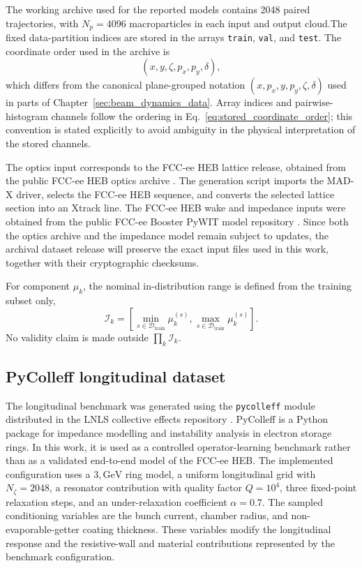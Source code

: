 The working archive used for the reported models contains 2048 paired trajectories, with $N_p=4096$ macroparticles in each input and output cloud.The fixed data-partition indices are stored in the arrays \texttt{train}, \texttt{val}, and \texttt{test}. The coordinate order used in the archive is
\begin{equation}
\left(
x,
y,
\zeta,
p_x,
p_y,
\delta
\right),
\label{eq:stored_coordinate_order}
\end{equation}
which differs from the canonical plane-grouped notation
$\left(x,p_x,y,p_y,\zeta,\delta\right)$ used in parts of Chapter~\ref{sec:beam_dynamics_data}. Array indices and pairwise-histogram channels follow the ordering in Eq.~\eqref{eq:stored_coordinate_order}; this convention is stated explicitly to avoid ambiguity in the physical interpretation of the stored channels.

The optics input corresponds to the FCC-ee HEB lattice release, obtained from the public FCC-ee HEB optics archive \cite{fcc_heb_lattice_v24_1}. The generation script imports the MAD-X driver, selects the FCC-ee HEB sequence, and converts the selected lattice section into an Xtrack line. The FCC-ee HEB wake and impedance inputs were obtained from the public FCC-ee Booster PyWIT model repository \cite{fcc_ee_booster_pywit_model}. Since both the optics archive and the impedance model remain subject to updates, the archival dataset release will preserve the exact input files used in this work, together with their cryptographic checksums.

For component $\mu_k$, the nominal in-distribution range is defined from the training subset only,
\begin{equation}
    \mathcal{I}_k
    =
    \left[
        \min_{s\in\mathcal{D}_{\mathrm{train}}}\mu_k^{(s)},
        \max_{s\in\mathcal{D}_{\mathrm{train}}}\mu_k^{(s)}
    \right].
    \label{eq:training_parameter_domain}
\end{equation}
No validity claim is made outside $\prod_k\mathcal{I}_k$.



\subsection{PyColleff longitudinal dataset}
\label{subsec:pycolleff_longitudinal_data}

The longitudinal benchmark was generated using the \texttt{pycolleff} module distributed in the LNLS collective effects repository \cite{pycolleff_software}. PyColleff is a Python package for impedance modelling and instability analysis in electron storage rings. In this work, it is used as a controlled operator-learning benchmark rather than as a validated end-to-end model of the FCC-ee HEB. The implemented configuration uses a $3,\mathrm{GeV}$ ring model, a uniform longitudinal grid with $N_{\zeta}=2048$, a resonator contribution with quality factor $Q=10^{4}$, three fixed-point relaxation steps, and an under-relaxation coefficient $\alpha=0.7$. The sampled conditioning variables are the bunch current, chamber radius, and non-evaporable-getter coating thickness. These variables modify the longitudinal response and the resistive-wall and material contributions represented by the benchmark configuration.

